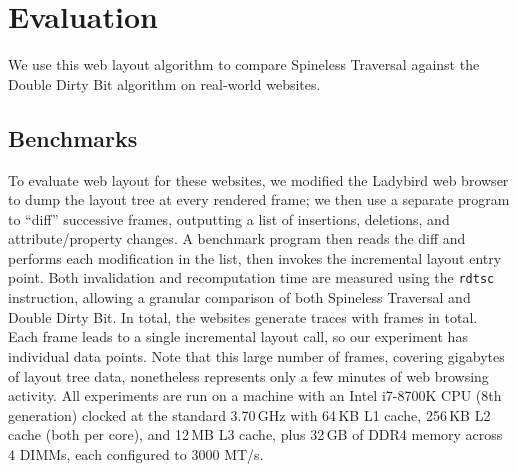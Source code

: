 \section{Evaluation}

We use this web layout algorithm
  to compare Spineless Traversal
  against the Double Dirty Bit algorithm
  on \NumWebsites real-world websites.

\subsection{Benchmarks}

To evaluate web layout for these websites,
  we modified the Ladybird web browser
  to dump the layout tree at every rendered frame;
  we then use a separate program to ``diff'' successive frames,
  outputting a list of insertions, deletions,
  and attribute/property changes.
A benchmark program then reads the diff
  and performs each modification in the list,
  then invokes the incremental layout entry point.
Both invalidation and recomputation time
  are measured using the \texttt{rdtsc} instruction,
  allowing a granular comparison of both
  Spineless Traversal and Double Dirty Bit.
In total, the \NumWebsites websites generate traces
  with \NumFrames frames in total.
Each frame leads to a single incremental layout call,
  so our experiment has \NumFrames individual data points.
Note that this large number of frames,
  covering gigabytes of layout tree data,
  nonetheless represents only a few minutes of web browsing activity.
All experiments are run on a machine with
  an Intel i7-8700K CPU (8th generation)
  clocked at the standard 3.70\,GHz
  with 64\,KB L1 cache, 256\,KB L2 cache (both per core),
  and 12\,MB L3 cache, plus
  32\,GB of DDR4 memory across 4 DIMMs,
  each configured to 3000 MT/s.


